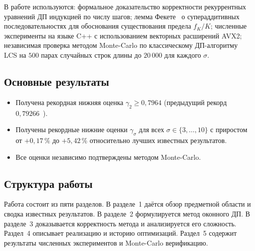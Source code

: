 В работе используются: формальное доказательство корректности рекуррентных уравнений ДП индукцией по числу шагов; лемма Фекете~\cite{fekete1923} о супераддитивных последовательностях для обоснования существования предела $f_K/K$; численные эксперименты на языке C++ с использованием векторных расширений AVX2; независимая проверка методом Monte-Carlo по классическому ДП-алгоритму LCS на $500$ парах случайных строк длины до $20\,000$ для каждого $\sigma$.

\subsection*{Основные результаты}

\begin{itemize}
    \item Получена рекордная нижняя оценка $\gamma_2 \geq 0{,}7964$ (предыдущий рекорд $0{,}79266$~\cite{heineman2024}).
    \item Получены рекордные нижние оценки $\gamma_\sigma$ для всех $\sigma \in \{3, \ldots, 10\}$ с приростом от $+0{,}17\,\%$ до $+5{,}42\,\%$ относительно лучших известных результатов.
    \item Все оценки независимо подтверждены методом Monte-Carlo.
\end{itemize}

\subsection*{Структура работы}

Работа состоит из пяти разделов. В разделе~1 даётся обзор предметной области и сводка известных результатов. В разделе~2 формулируется метод оконного ДП. В разделе~3 доказывается корректность метода и анализируется его сложность. Раздел~4 описывает реализацию и историю оптимизаций. Раздел~5 содержит результаты численных экспериментов и Monte-Carlo верификацию.
